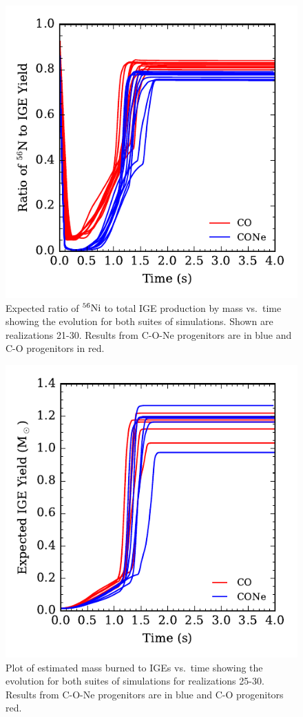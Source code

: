 \documentclass[preprint2]{aastex63}
\newcommand{\Ni}[1]{\ensuremath{{}^{#1}{\rm Ni}}}
\begin{document}
\begin{figure}
\includegraphics[width=\columnwidth]{figures/RatioNi56IGE_v_time_plot.pdf}
\caption{\label{fig:compare_ratio}
Expected ratio of \Ni{56} to total IGE production by mass vs.\ time showing the evolution
for both suites of simulations. 
{\color{blue} Shown are realizations 21-30.}
Results from C-O-Ne progenitors are in blue and C-O progenitors in red.
}
\end{figure}
\begin{figure}
\includegraphics[width=\columnwidth]{figures/MBTI_v_time_plot.pdf}
\caption{\label{fig:compare_burned}
Plot of estimated mass burned to IGEs vs.\ time showing the evolution
for both suites of simulations for realizations 25-30. Results from C-O-Ne progenitors are
in blue and C-O progenitors red.
}
\end{figure}
\end{document}
